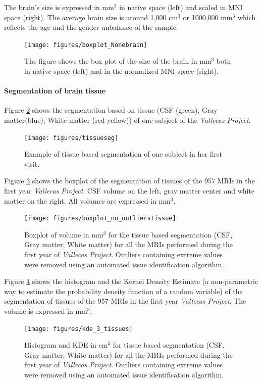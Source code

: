 \documentclass[11pt]{article}
\theoremstyle{definition}
\theoremstyle{remark}
\begin{document}
The brain's size is expressed in mm${^3}$ in native space (left) and scaled in MNI space (right). The average brain size is around 1,000 cm${^3}$ or 1000,000 mm${^3}$ which reflects the age and the gender unbalance of the sample.

\begin{figure}[H]
        \centering
        \texttt{[image: figures/boxplot\_Nonebrain]}
        \caption{The figure shows the box plot of the size of the brain in mm${^3}$ both in native space (left) and in the normalized MNI space (right).} 
        \label{fig:boxbet}
\end{figure}

\paragraph*{Segmentation of brain tissue}
Figure \ref{fig:tissueseg} shows the segmentation based on tissue (CSF (green), Gray matter(blue); White matter (red-yellow)) of one subject of the \emph{Vallecas Project}.

\begin{figure}[H]
        \centering
        \texttt{[image: figures/tissueseg]}
        \caption{Example of tissue based segmentation of one subject in her first visit. } 
        \label{fig:tissueseg}
\end{figure}

Figure \ref{fig:boxtissue} shows the boxplot of the segmentation of tissues of the 957 MRIs in the first year \emph{Vallecas Project}. CSF volume on the left, gray matter center and white matter on the right. All volumes are expressed in mm${^3}$.


\begin{figure}[H]
        \centering
        \texttt{[image: figures/boxplot\_no\_outlierstissue]}
        \caption{Boxplot of volume in mm${^3}$ for the tissue based segmentation (CSF, Gray matter, White matter) for all the MRIs performed during the first year of \emph{Vallecas Project}. Outliers containing extreme values were removed using an automated issue identification algorithm.} 
        \label{fig:boxtissue}
\end{figure}

Figure \ref{fig:kde_3_tissues} shows the histogram and the Kernel Density Estimate (a non-parametric way to estimate the probability density function of a random variable) of the segmentation of tissues of the 957 MRIs in the first year \emph{Vallecas Project}. The volume is expressed in mm${^3}$.
\begin{figure}[H]
        \centering
        \texttt{[image: figures/kde\_3\_tissues]}
        \caption{Histogram and KDE in cm${^3}$ for tissue based segmentation (CSF, Gray matter, White matter) for all the MRIs performed during the first year of \emph{Vallecas Project}. Outliers containing extreme values were removed using an automated issue identification algorithm.} 
        \label{fig:kde_3_tissues}
\end{figure}
\end{document}
